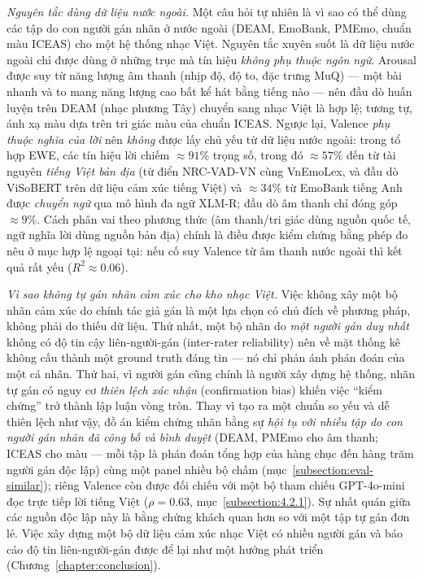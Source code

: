 \documentclass[../DoAn.tex]{subfiles}
\begin{document}
\textit{Nguyên tắc dùng dữ liệu nước ngoài.} Một câu hỏi tự nhiên là vì sao có thể dùng các tập do con người gán nhãn ở nước ngoài (DEAM, EmoBank, PMEmo, chuẩn màu ICEAS) cho một hệ thống nhạc Việt. Nguyên tắc xuyên suốt là dữ liệu nước ngoài chỉ được dùng ở những trục mà tín hiệu \emph{không phụ thuộc ngôn ngữ}. Arousal được suy từ năng lượng âm thanh (nhịp độ, độ to, đặc trưng MuQ) --- một bài nhanh và to mang năng lượng cao bất kể hát bằng tiếng nào --- nên đầu dò huấn luyện trên DEAM (nhạc phương Tây) chuyển sang nhạc Việt là hợp lệ; tương tự, ánh xạ màu dựa trên tri giác màu của chuẩn ICEAS. Ngược lại, Valence \emph{phụ thuộc nghĩa của lời} nên \emph{không} được lấy chủ yếu từ dữ liệu nước ngoài: trong tổ hợp EWE, các tín hiệu lời chiếm $\approx 91\%$ trọng số, trong đó $\approx 57\%$ đến từ tài nguyên \emph{tiếng Việt bản địa} (từ điển NRC-VAD-VN cùng VnEmoLex, và đầu dò ViSoBERT trên dữ liệu cảm xúc tiếng Việt) và $\approx 34\%$ từ EmoBank tiếng Anh được \emph{chuyển ngữ} qua mô hình đa ngữ XLM-R; đầu dò âm thanh chỉ đóng góp $\approx 9\%$. Cách phân vai theo phương thức (âm thanh/tri giác dùng nguồn quốc tế, ngữ nghĩa lời dùng nguồn bản địa) chính là điều được kiểm chứng bằng phép đo nêu ở mục hợp lệ ngoại tại: nếu cố suy Valence từ âm thanh nước ngoài thì kết quả rất yếu ($R^2 \approx 0.06$).

\textit{Vì sao không tự gán nhãn cảm xúc cho kho nhạc Việt.} Việc không xây một bộ nhãn cảm xúc do chính tác giả gán là một lựa chọn có chủ đích về phương pháp, không phải do thiếu dữ liệu. Thứ nhất, một bộ nhãn do \emph{một người gán duy nhất} không có độ tin cậy liên-người-gán (inter-rater reliability) nên về mặt thống kê không cấu thành một ground truth đáng tin --- nó chỉ phản ánh phán đoán của một cá nhân. Thứ hai, vì người gán cũng chính là người xây dựng hệ thống, nhãn tự gán có nguy cơ \emph{thiên lệch xác nhận} (confirmation bias) khiến việc ``kiểm chứng'' trở thành lập luận vòng tròn. Thay vì tạo ra một chuẩn so yếu và dễ thiên lệch như vậy, đồ án kiểm chứng nhãn bằng sự \emph{hội tụ với nhiều tập do con người gán nhãn đã công bố và bình duyệt} (DEAM, PMEmo cho âm thanh; ICEAS cho màu --- mỗi tập là phán đoán tổng hợp của hàng chục đến hàng trăm người gán độc lập) cùng một panel nhiều bộ chấm (mục~\ref{subsection:eval-similar}); riêng Valence còn được đối chiếu với một bộ tham chiếu GPT-4o-mini đọc trực tiếp lời tiếng Việt ($\rho = 0.63$, mục~\ref{subsection:4.2.1}). Sự nhất quán giữa các nguồn độc lập này là bằng chứng khách quan hơn so với một tập tự gán đơn lẻ. Việc xây dựng một bộ dữ liệu cảm xúc nhạc Việt có nhiều người gán và báo cáo độ tin liên-người-gán được để lại như một hướng phát triển (Chương~\ref{chapter:conclusion}).
\end{document}

